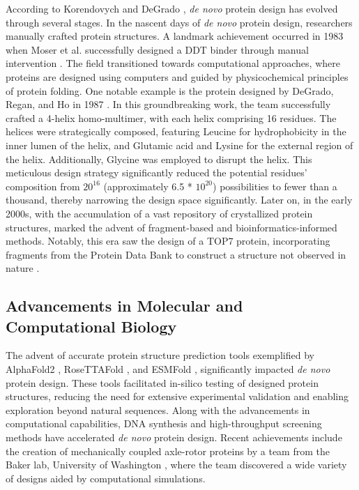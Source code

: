 \documentclass[11pt,a4paper]{article}
\begin{document}
According to Korendovych and DeGrado \cite{korendovych2020novo}, \emph{de novo} 
protein design has evolved through several stages.
In the nascent days of \emph{de novo} protein design, researchers manually 
crafted protein structures. A landmark achievement occurred in 1983 
when Moser et al. successfully designed a DDT binder through manual 
intervention \cite{moser1983artificial}.
The field transitioned towards computational approaches, where proteins 
are designed using computers and guided by physicochemical principles 
of protein folding. One notable example is the protein designed by 
DeGrado, Regan, and Ho in 1987 \cite{degrado1987design}. In this 
groundbreaking work, the team successfully crafted a 4-helix 
homo-multimer, with each helix comprising 16 residues. The helices were 
strategically composed, featuring Leucine for hydrophobicity in the 
inner lumen of the helix, and Glutamic acid and Lysine for the external 
region of the helix. Additionally, Glycine was employed to disrupt the 
helix. This meticulous design strategy significantly reduced the 
potential residues' composition from $20^{16}$ (approximately 6.5 * $10^
{20}$) possibilities to fewer than a thousand, thereby narrowing the 
design space significantly. 
Later on, in the early 2000s, with the accumulation of a vast repository 
of crystallized protein structures,  marked the advent of 
fragment-based and bioinformatics-informed methods. Notably, this era 
saw the design of a  TOP7 protein, incorporating fragments from the 
Protein Data Bank to construct a structure not observed in nature \cite
{kuhlman2003design}.

\subsection{Advancements in Molecular and Computational Biology}

The advent of accurate protein structure prediction tools exemplified 
by AlphaFold2 \cite{jumper2021highly}, RoseTTAFold \cite
{baek2021accurate}, and ESMFold \cite{lin2022language}, significantly 
impacted \emph{de novo} protein design. These tools facilitated in-silico 
testing of designed protein structures, reducing the need for extensive 
experimental validation and enabling exploration beyond natural 
sequences.
Along with the advancements in computational capabilities, DNA synthesis 
and high-throughput screening methods have accelerated \emph{de novo} protein 
design. Recent achievements include the creation of mechanically 
coupled  axle-rotor proteins by a team from the Baker lab, University 
of Washington \cite{courbet2022computational,bakerlab}, where the team 
discovered a wide variety of designs aided by computational simulations.
\end{document}
